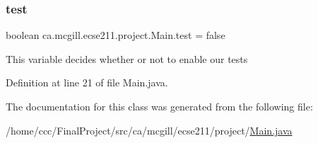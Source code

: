 \subsubsection{\texorpdfstring{test}{test}}
{\footnotesize\ttfamily boolean ca.\+mcgill.\+ecse211.\+project.\+Main.\+test = false\hspace{0.3cm}{\ttfamily [static]}}

This variable decides whether or not to enable our tests 

Definition at line 21 of file Main.\+java.



The documentation for this class was generated from the following file\+:\begin{DoxyCompactItemize}
\item 
/home/ccc/\+Final\+Project/src/ca/mcgill/ecse211/project/\hyperlink{_main_8java}{Main.\+java}\end{DoxyCompactItemize}
